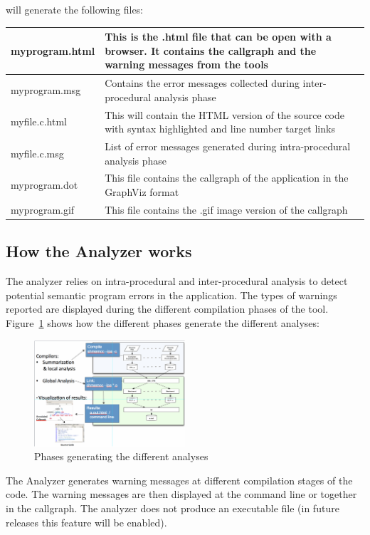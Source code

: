 will generate the following files:

\vspace{0.1in}

\begin{center}
  \begin{tabular}{| l | p{10cm} |}
    \hline
    myprogram.html & This is the .html file that can be open with a browser. It contains the callgraph and the warning messages from the tools \\
    \hline
    myprogram.msg & Contains the error messages collected during inter-procedural analysis phase \\
    \hline
    myfile.c.html & This will contain the HTML version of the source code with syntax highlighted and line number target links \\
    \hline
    myfile.c.msg & List of error messages generated during intra-procedural analysis phase \\
    \hline
    myprogram.dot & This file contains the callgraph of the application in the GraphViz format \\
    \hline
    myprogram.gif & This file contains the .gif image version of the callgraph \\
    \hline
  \end{tabular}
\end{center}

\subsection{How the \openshmem Analyzer works}

The \openshmem analyzer relies on intra-procedural and inter-procedural
analysis to detect potential semantic program errors in the
application. The types of warnings reported are displayed during the
different compilation phases of the tool. Figure~\ref{fig:phases} shows
how the different phases generate the different analyses:

\begin{figure}[!h]
  \begin{center}
    \includegraphics[width=0.5\textwidth]{./image002}
    \caption{Phases generating the different analyses}
    \label{fig:phases}
  \end{center}
\end{figure}

The \openshmem Analyzer generates warning messages at different
compilation stages of the code. The warning messages are then
displayed at the command line or together in the callgraph.  The
\openshmem analyzer does not produce an executable file (in future
releases this feature will be enabled).

